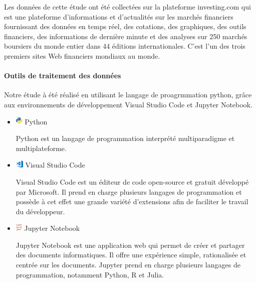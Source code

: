 {Les données de cette étude ont été collectées sur la plateforme
investing.com qui est une plateforme d'informations et d'actualités sur
les marchés financiers fournissant des données en temps réel, des
cotations, des graphiques, des outils financiers, des informations de
dernière minute et des analyses sur 250 marchés boursiers du monde
entier dans 44 éditions internationales. C'est l'un des trois premiers
sites Web financiers mondiaux au monde.}

\paragraph{Outils de traitement des
données}\label{outils-de-traitement-des-donnuxe9es}

{ Notre étude à été réalisé en utilisant le langage de proagrmmation
python, grâce aux environnements de développement Visual Studio Code et
Jupyter Notebook.}

\begin{itemize}
\item
  \includegraphics[width=\textwidth,height=1em]{icons/python-icon.jpg}
  Python

  {Python est un langage de programmation interprété multiparadigme et
  multiplateforme.}
\item
  \includegraphics[width=\textwidth,height=1em]{icons/vscode-icon.png}
  Visual Studio Code

  {Visual Studio Code est un éditeur de code open-source et gratuit
  développé par Microsoft. Il prend en charge plusieurs langages de
  programmation et possède à cet effet une grande variété d'extensions
  afin de faciliter le travail du développeur.}
\item
  \includegraphics[width=\textwidth,height=1em]{icons/jupyter-icon.png}
  Jupyter Notebook

  { Jupyter Notebook est une application web qui permet de créer et
  partager des documents informatiques. Il offre une expérience simple,
  rationalisée et centrée sur les documents. Jupyter prend en charge
  plusieurs langages de programmation, notamment Python, R et Julia.}
\end{itemize}

